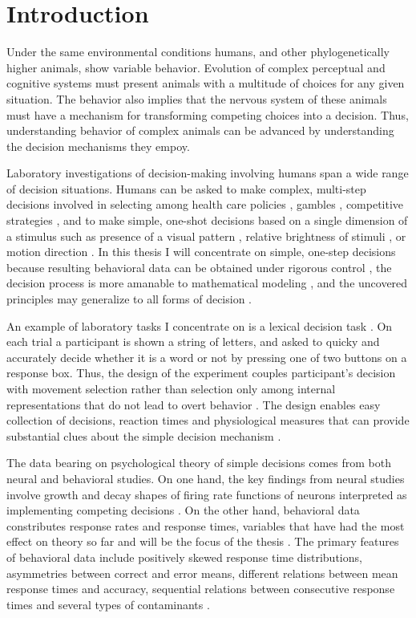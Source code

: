 \documentclass[12pt]{article}
\begin{document}
\section{Introduction}
Under the same environmental conditions humans, and other phylogenetically higher animals, show variable behavior. Evolution of complex perceptual and cognitive systems must present animals with a multitude of choices for any given situation. The behavior also implies that the nervous system of these animals must have a mechanism for transforming competing choices into a decision. Thus, understanding behavior of complex animals can be advanced by understanding the decision mechanisms they empoy.

Laboratory investigations of decision-making involving humans span a wide range of decision situations. Humans can be asked to make complex, multi-step decisions involved in selecting among health care policies \citep{PetHar2014}, gambles \citep{TveKah1981}, competitive strategies \citep{Cam2003}, and to make simple, one-shot decisions based on a single dimension of a stimulus such as presence of a visual pattern \citep{Smi1995}, relative brightness of stimuli \citep{RatRou1998}, or motion direction \citep{RatMck2008}. In this thesis I will concentrate on simple, one-step decisions because resulting behavioral data can be obtained under rigorous control \citep{ZanTow2013}, the decision process is more amanable to mathematical modeling \citep{Coo1983,LewFar2010}, and the uncovered principles may generalize to all forms of decision \citep{ShaKia2013}.

An example of laboratory tasks I concentrate on is a lexical decision task \citep{Wag2009}. On each trial a participant is shown a string of letters, and asked to quicky and accurately decide whether it is a word or not by pressing one of two buttons on a response box. Thus, the design of the experiment couples participant's decision with movement selection rather than selection only among internal representations that do not lead to overt behavior \citep{ZanTow2013}. The design enables easy collection of decisions, reaction times and physiological measures that can provide substantial clues about the simple decision mechanism \citep{Luc1986,ShaKia2013,MulMaa2014}.

The data bearing on psychological theory of simple decisions comes from both neural and behavioral studies. On one hand, the key findings from neural studies involve growth and decay shapes of firing rate functions of neurons interpreted as implementing competing decisions \citep{GolSha2007}. On the other hand, behavioral data constributes response rates and response times, variables that have had the most effect on theory so far and will be the focus of the thesis \citep{Sto1960,Edw1965, TowAsh1983,ShaNew1996,RatRou1998,SmiRat2004,Bog2007,MulMaa2014}. The primary features of behavioral data include positively skewed response time distributions, asymmetries between correct and error means, different relations between mean response times and accuracy, sequential relations between consecutive response times and several types of contaminants \citep{CraPer2010,Rat2014}. 
\end{document}
